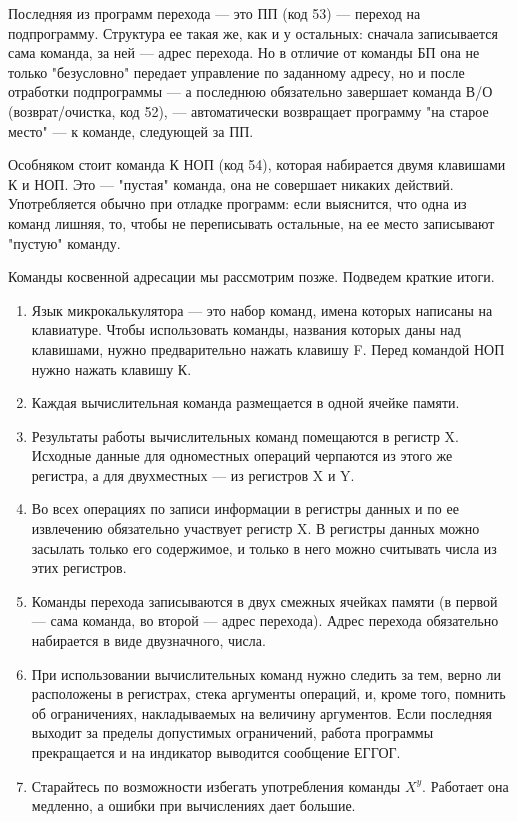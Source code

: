 \documentclass[11pt,a4paper,oneside]{article}
\begin{document}
Последняя из программ перехода — это ПП (код 53) — переход на подпрограмму. Структура ее такая же, как и у остальных: сначала записывается сама команда, за ней — адрес перехода. Но в отличие от команды БП она не только "безусловно" передает управление по заданному адресу, но и после отработки подпрограммы — а последнюю обязательно завершает команда В/О (возврат/очистка, код 52), — автоматически возвращает программу "на старое место" — к команде, следующей за ПП.

Особняком стоит команда К НОП (код 54), которая набирается двумя клавишами К и НОП. Это — "пустая" команда, она не совершает никаких действий. Употребляется обычно при отладке программ: если выяснится, что одна из команд лишняя, то, чтобы не переписывать остальные, на ее место записывают "пустую" команду.

Команды косвенной адресации мы рассмотрим позже. Подведем краткие итоги.

\begin{enumerate}
\item Язык микрокалькулятора — это набор команд, имена которых написаны на клавиатуре. Чтобы использовать команды, названия которых даны над клавишами, нужно предварительно нажать клавишу F. Перед командой НОП нужно нажать клавишу К.
\item Каждая вычислительная команда размещается в одной ячейке памяти.
\item Результаты работы вычислительных команд помещаются в регистр X. Исходные данные для одноместных операций черпаются из этого же регистра, а для двухместных — из регистров X и Y.
\item Во всех операциях по записи информации в регистры данных и по ее извлечению обязательно участвует регистр X. В регистры данных можно засылать только его содержимое, и только в него можно считывать числа из этих регистров.
\item Команды перехода записываются в двух смежных ячейках памяти (в первой — сама команда, во второй — адрес перехода). Адрес перехода обязательно набирается в виде двузначного, числа.
\item При использовании вычислительных команд нужно следить за тем, верно ли расположены в регистрах, стека аргументы операций, и, кроме того, помнить об ограничениях, накладываемых на величину аргументов. Если последняя выходит за пределы допустимых ограничений, работа программы прекращается и на индикатор выводится сообщение ЕГГОГ.
\item Старайтесь по возможности избегать употребления команды $X^{y}$. Работает она медленно, а ошибки при вычислениях дает большие.
\end{enumerate}
\end{document}
